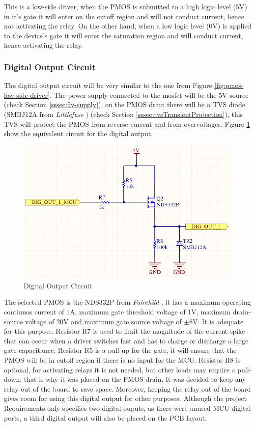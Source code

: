 			This is a low-side driver, when the PMOS is submitted to a high logic level (5V) in it's gate it will enter on the cutoff region and will not conduct current, hence not activating the relay. On the other hand, when a low logic level (0V) is applied to the device's gate it will enter the saturation region and will conduct current, hence activating the relay.

		\subsubsection{Digital Output Circuit}\label{sssec:digital-output-circuit}

			The digital output circuit will be very similar to the one from Figure \ref{fig:pmos-low-side-driver}. The power supply connected to the mosfet will be the 5V source (check Section \ref{sssec:5v-supply}), on the PMOS drain there will be a TVS diode (SMBJ12A from \textit{Littlefuse} \cite{smbj12a-datasheet}) (check Section \ref{sssec:tvsTransientProtection}), this TVS will protect the PMOS from reverse current and from overvoltages. Figure \ref{fig:digital-output-circuit} show the equivalent circuit for the digital output.

			\begin{figure}[htbp]
				\centering
				\includegraphics[width=.8\textwidth]{figuras/fig-digital-output-circuit.png}
				\caption{Digital Output Circuit}
				\label{fig:digital-output-circuit}
			\end{figure}

			The selected PMOS is the NDS332P from \textit{Fairchild} \cite{nds332p-datasheet}, it has a maximum operating continuos current of 1A, maximum gate threshold voltage of 1V, maximum drain-source voltage of 20V and maximum gate source voltage of $\pm$8V. It is adequate for this purpose. Resistor R7 is used to limit the magnitude of the current spike that can occur when a driver switches fast and has to charge or discharge a large gate capacitance. Resistor R5 is a pull-up for the gate, it will ensure that the PMOS will be in cutoff region if there is no input for the MCU. Resistor R8 is optional, for activating relays it is not needed, but other loads may require a pull-down, that is why it was placed on the PMOS drain. It was decided to keep any relay out of the board to save space. Moreover, keeping the relay out of the board gives room for using this digital output for other purposes. Although the project Requirements only specifies two digital ouputs, as there were unused MCU digital ports, a third digital output will also be placed on the PCB layout. 

